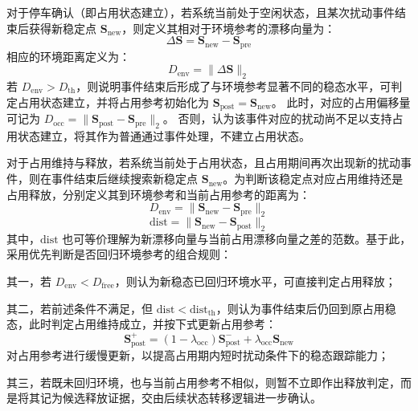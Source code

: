\documentclass{xdupgthesis}
\begin{document}
对于停车确认（即占用状态建立），若系统当前处于空闲状态，且某次扰动事件结束后获得新稳定点 $\mathbf{S}_{\mathrm{new}}$，则定义其相对于环境参考的漂移向量为：
\begin{equation}
    \Delta\mathbf{S}=\mathbf{S}_{\mathrm{new}}-\mathbf{S}_{\mathrm{pre}}
\end{equation}
相应的环境距离定义为：
\begin{equation}
    D_{\mathrm{env}}=\lVert\Delta\mathbf{S}\rVert_2
\end{equation}
若 $D_{\mathrm{env}}>D_{\mathrm{th}}$，则说明事件结束后形成了与环境参考显著不同的稳态水平，可判定占用状态建立，并将占用参考初始化为 $\mathbf{S}_{\mathrm{post}}=\mathbf{S}_{\mathrm{new}}$。
此时，对应的占用偏移量可记为 $D_{\mathrm{occ}}=\lVert\mathbf{S}_{\mathrm{post}}-\mathbf{S}_{\mathrm{pre}}\rVert_2$。
否则，认为该事件对应的扰动尚不足以支持占用状态建立，将其作为普通通过事件处理，不建立占用状态。

对于占用维持与释放，若系统当前处于占用状态，且占用期间再次出现新的扰动事件，则在事件结束后继续搜索新稳定点 $\mathbf{S}_{\mathrm{new}}$。为判断该稳定点对应占用维持还是占用释放，分别定义其到环境参考和当前占用参考的距离为：
\begin{equation}
    D_{\mathrm{env}}=\lVert\mathbf{S}_{\mathrm{new}}-\mathbf{S}_{\mathrm{pre}}\rVert_2
\end{equation}
\begin{equation}
    \mathrm{dist}=\lVert\mathbf{S}_{\mathrm{new}}-\mathbf{S}_{\mathrm{post}}\rVert_2
\end{equation}
其中，$\mathrm{dist}$ 也可等价理解为新漂移向量与当前占用漂移向量之差的范数。基于此，采用优先判断是否回归环境参考的组合规则：

其一，若 $D_{\mathrm{env}}<D_{\mathrm{free}}$，则认为新稳态已回归环境水平，可直接判定占用释放；

其二，若前述条件不满足，但 $\mathrm{dist}<\mathrm{dist}_{\mathrm{th}}$，则认为事件结束后仍回到原占用稳态，此时判定占用维持成立，并按下式更新占用参考：
\begin{equation}
    \mathbf{S}_{\mathrm{post}}^{+}=(1-\lambda_{\mathrm{occ}})\mathbf{S}_{\mathrm{post}}^{-}
    +\lambda_{\mathrm{occ}}\mathbf{S}_{\mathrm{new}}
\end{equation}
对占用参考进行缓慢更新，以提高占用期内短时扰动条件下的稳态跟踪能力；

其三，若既未回归环境，也与当前占用参考不相似，则暂不立即作出释放判定，而是将其记为候选释放证据，交由后续状态转移逻辑进一步确认。
\end{document}
